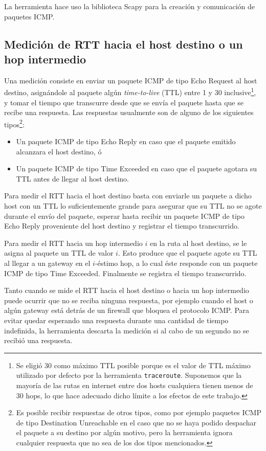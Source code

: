 \documentclass[a4paper, 10pt, twoside]{article}
\begin{document}
La herramienta hace uso la biblioteca Scapy \cite{scapy} para la creación y comunicación de paquetes ICMP.


\subsection{Medición de RTT hacia el host destino o un hop intermedio}

Una medición consiste en enviar un paquete ICMP de tipo Echo Request al host destino, asignándole al paquete algún \emph{time-to-live} (TTL) entre 1 y 30 inclusive\footnote{Se eligió 30 como máximo TTL posible porque es el valor de TTL máximo utilizado por defecto por la herramienta \texttt{traceroute}. Suponemos que la mayoría de las rutas en internet entre dos hosts cualquiera tienen menos de 30 hops, lo que hace adecuado dicho límite a los efectos de este trabajo.}, y tomar el tiempo que transcurre desde que se envía el paquete hasta que se recibe una respuesta. Las respuestas usualmente son de alguno de los siguientes tipos\footnote{Es posible recibir respuestas de otros tipos, como por ejemplo paquetes ICMP de tipo Destination Unreachable en el caso que no se haya podido despachar el paquete a su destino por algún motivo, pero la herramienta ignora cualquier respuesta que no sea de los dos tipos mencionados.
}:

\begin{itemize}
  \item Un paquete ICMP de tipo Echo Reply en caso que el paquete emitido alcanzara el host destino, ó
  \item Un paquete ICMP de tipo Time Exceeded en caso que el paquete agotara su TTL antes de llegar al host destino.
\end{itemize}

Para medir el RTT hacia el host destino basta con enviarle un paquete a dicho host con un TTL lo suficientemente grande para asegurar que su TTL no se agote durante el envío del paquete, esperar hasta recibir un paquete ICMP de tipo Echo Reply proveniente del host destino y registrar el tiempo transcurrido.

Para medir el RTT hacia un hop intermedio $i$ en la ruta al host destino, se le asigna al paquete un TTL de valor $i$. Esto produce que el paquete agote su TTL al llegar a un gateway en el $i$-éstimo hop, a lo cual éste responde con un paquete ICMP de tipo Time Exceeded. Finalmente se registra el tiempo transcurrido.

Tanto cuando se mide el RTT hacia el host destino o hacia un hop intermedio puede ocurrir que no se reciba ninguna respuesta, por ejemplo cuando el host o algún gateway está detrás de un firewall que bloquea el protocolo ICMP. Para evitar quedar esperando una respuesta durante una cantidad de tiempo indefinida, la herramienta descarta la medición si al cabo de un segundo no se recibió una respuesta.
\end{document}
